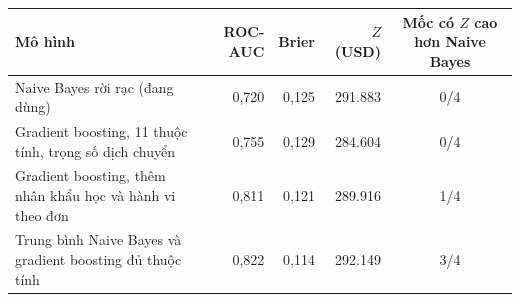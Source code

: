 \begin{tabular}{p{6.6cm}rrrc}
\toprule
Mô hình & ROC-AUC & Brier & $Z$ (USD) & Mốc có $Z$ cao hơn Naive Bayes \\
\midrule
Naive Bayes rời rạc (đang dùng) & 0,720 & 0,125 & 291.883 & 0/4 \\
Gradient boosting, 11 thuộc tính, trọng số dịch chuyển & 0,755 & 0,129 & 284.604 & 0/4 \\
Gradient boosting, thêm nhân khẩu học và hành vi theo đơn & 0,811 & 0,121 & 289.916 & 1/4 \\
Trung bình Naive Bayes và gradient boosting đủ thuộc tính & 0,822 & 0,114 & 292.149 & 3/4 \\
\bottomrule
\end{tabular}
